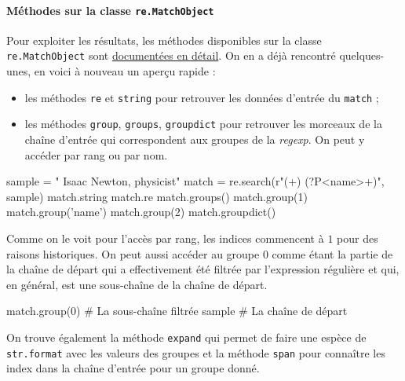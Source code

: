 \paragraph{Méthodes sur la classe {\normalfont\texttt{re.MatchObject}}}
Pour exploiter les résultats, les méthodes disponibles sur la classe \texttt{re.MatchObject} sont \href{https://docs.python.org/3/library/re.html#match-objects}{documentées en détail}. On en a déjà rencontré quelques-unes, en voici à nouveau un aperçu rapide :
\begin{itemize}
\item  les méthodes \texttt{re} et \texttt{string} pour retrouver les données d'entrée du \texttt{match} ;
\item  les méthodes \texttt{group}, \texttt{groups}, \texttt{groupdict} pour retrouver les morceaux de la chaîne d'entrée qui correspondent aux groupes de la \textit{regexp}. On peut y accéder par rang ou par nom.
\end{itemize}

\begin{idleconsole}
	\begin{pyconsole}
sample = "    Isaac Newton, physicist"
match = re.search(r"(\w+) (?P<name>\w+)", sample)
match.string
match.re
match.groups()
match.group(1)
match.group('name')
match.group(2)
match.groupdict()
	\end{pyconsole}
\end{idleconsole}

Comme on le voit pour l'accès par rang, les indices commencent à $1$ pour des raisons historiques. 
On peut aussi accéder au groupe $0$ comme étant la partie de la chaîne de départ qui a effectivement été filtrée par l'expression régulière et qui, en général, est une sous-chaîne de la chaîne de départ.

\begin{idleconsole}
	\begin{pyconsole}
match.group(0) # La sous-chaîne filtrée
sample # La chaîne de départ
	\end{pyconsole}
\end{idleconsole}

On trouve également la méthode \texttt{expand} qui permet de faire une espèce de \texttt{str.format} avec les valeurs des groupes et la méthode \texttt{span} pour connaître les index dans la chaîne d'entrée pour un groupe donné.

